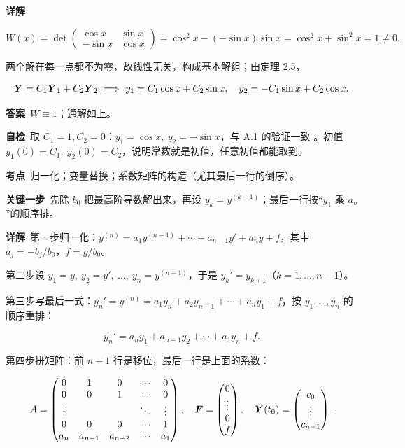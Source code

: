 \documentclass[11pt]{ctexart}
\renewcommand{\qbreak}{\needspace{0.26\textheight}}
\newcommand{\qpagebreak}{\needspace{0.92\textheight}}
\newcommand{\mat}[1]{\begin{pmatrix}#1\end{pmatrix}}
\begin{document}
\textbf{详解}\

\[
W(x)=\det\mat{\cos x & \sin x\\ -\sin x & \cos x}
=\cos^2x-(-\sin x)\sin x=\cos^2x+\sin^2x=1\neq0 .
\]

两个解在每一点都不为零，故线性无关，构成基本解组；由定理 2.5，

\[
\boldsymbol{Y}=C_1\boldsymbol{Y}_1+C_2\boldsymbol{Y}_2
\ \Longrightarrow\
y_1=C_1\cos x+C_2\sin x,\quad y_2=-C_1\sin x+C_2\cos x .
\]

\textbf{答案}\ $W\equiv1$；通解如上。

\textbf{自检}\ 取 $C_1=1,C_2=0$：$y_1=\cos x,\ y_2=-\sin x$，与 A.1 的验证一致 。初值 $y_1(0)=C_1,\ y_2(0)=C_2$，说明常数就是初值，任意初值都能取到。

\qpagebreak
{}
\label{c1:app:a6}

\qbreak
{}

\textbf{考点}\ 归一化；变量替换；系数矩阵的构造（尤其最后一行的倒序）。

\textbf{关键一步}\ 先除 $b_0$ 把最高阶导数解出来，再设 $y_k=y^{(k-1)}$；最后一行按“$y_1$ 乘 $a_n$”的顺序排。

\textbf{详解}\ 第一步归一化：$y^{(n)}=a_1y^{(n-1)}+\cdots+a_{n-1}y'+a_ny+f$，其中 $a_j=-b_j/b_0$，$f=g/b_0$。

第二步设 $y_1=y,\ y_2=y',\ \dots,\ y_n=y^{(n-1)}$，于是 $y_k'=y_{k+1}$（$k=1,\dots,n-1$）。

第三步写最后一式：$y_n'=y^{(n)}=a_1y_n+a_2y_{n-1}+\cdots+a_ny_1+f$，按 $y_1,\dots,y_n$ 的顺序重排：

\[
y_n'=a_ny_1+a_{n-1}y_2+\cdots+a_1y_n+f .
\]

第四步拼矩阵：前 $n-1$ 行是移位，最后一行是上面的系数：

\[
A=\begin{pmatrix}
0&1&0&\cdots&0\\
0&0&1&\cdots&0\\
\vdots& & &\ddots&\vdots\\
0&0&0&\cdots&1\\
a_n&a_{n-1}&a_{n-2}&\cdots&a_1
\end{pmatrix},\quad
\vect{F}=\mat{0\\ \vdots\\ 0\\ f},\quad
\vect{Y}(t_0)=\mat{c_0\\ \vdots\\ c_{n-1}}.
\]
\end{document}
